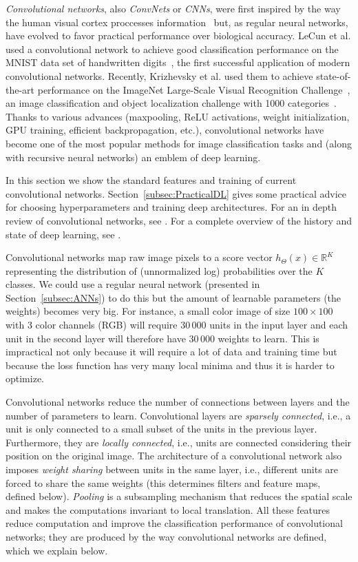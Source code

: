 \emph{Convolutional networks}, also \emph{ConvNets} or \emph{CNNs}, were first inspired by the way the human visual cortex proccesses information~\cite{Fukushima1980} but, as regular neural networks, have evolved to favor practical performance over biological accuracy. LeCun et al. used a convolutional network to achieve good classification performance on the MNIST data set of handwritten digits~\cite{LeCun1989, LeCun1998}, the first successful application of modern convolutional networks. Recently, Krizhevsky et al. used  them to achieve state-of-the-art performance on the ImageNet Large-Scale Visual Recognition Challenge~\cite{Krizhevsky2012}, an image classification and object localization challenge with 1000 categories~\cite{Russakovsky2015}. Thanks to various advances (maxpooling, ReLU activations, weight initialization, GPU training, efficient backpropagation, etc.), convolutional networks have become one of the most popular methods for image classification tasks and (along with recursive neural networks) an emblem of deep learning.

In this section we show the standard features and training of current convolutional networks. Section~\ref{subsec:PracticalDL} gives some practical advice for choosing hyperparameters and training deep architectures. For an in depth review of convolutional networks, see \cite{Karpathy2015}. For a complete overview of the history and state of deep learning, see \cite{Schmidhuber2015}.

Convolutional networks map raw image pixels to a score vector $h_\Theta(x) \in \mathbb{R}^K$ representing the distribution of (unnormalized log) probabilities over the $K$ classes. We could use a regular neural network (presented in Section~\ref{subsec:ANNs}) to do this but the amount of learnable parameters (the weights) becomes very big. For instance, a small color image of size $100\times100$ with 3 color channels (RGB) will require $30\,000$ units in the input layer and each unit in the second layer will therefore have $30\,000$ weights to learn. This is impractical not only because it will require a lot of data and training time but because the loss function has very many local minima and thus it is harder to optimize.

Convolutional networks reduce the number of connections between layers and the number of parameters to learn. Convolutional layers are \emph{sparsely connected}, i.e., a unit is only connected to a small subset of the units in the previous layer. Furthermore, they are \emph{locally connected}, i.e., units are connected considering their position on the original image. The architecture of a convolutional network also imposes \emph{weight sharing} between units in the same layer, i.e., different units are forced to share the same weights (this determines filters and feature maps, defined below). \emph{Pooling} is a subsampling mechanism that reduces the spatial scale and makes the computations invariant to local translation. All these features reduce computation and improve the classification performance of convolutional networks; they are produced by the way convolutional networks are defined, which we explain below.

